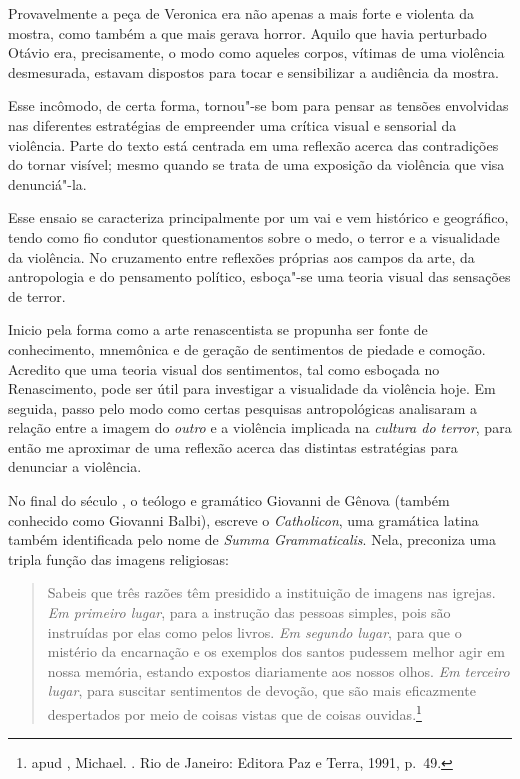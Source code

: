 Provavelmente a peça de Veronica era não apenas a mais forte e
violenta da mostra, como também a que mais gerava horror. Aquilo que
havia perturbado Otávio era, precisamente, o modo como
aqueles corpos, vítimas de uma violência desmesurada, estavam dispostos
para tocar e sensibilizar a audiência da mostra.

Esse incômodo, de certa forma,
tornou"-se bom para pensar as tensões envolvidas nas diferentes
estratégias de empreender uma crítica visual e sensorial da violência.
Parte do texto está centrada em uma reflexão acerca das contradições do
tornar visível; mesmo quando se trata de uma exposição da violência que
visa denunciá"-la.

Esse ensaio se caracteriza principalmente por um vai e
vem histórico e geográfico, tendo como fio condutor questionamentos
sobre o medo, o terror e a visualidade da violência. No cruzamento entre
reflexões próprias aos campos da arte, da antropologia e do pensamento
político, esboça"-se uma teoria visual das sensações de terror.

Inicio pela forma como a arte renascentista se propunha
ser fonte de conhecimento, mnemônica e de geração de sentimentos de
piedade e comoção. Acredito que uma teoria visual dos sentimentos, tal
como esboçada no Renascimento, pode ser útil para investigar a
visualidade da violência hoje. Em seguida, passo pelo modo como certas
pesquisas antropológicas analisaram a relação entre a imagem do
\emph{outro} e a violência implicada na \emph{cultura do terror}, para
então me aproximar de uma reflexão acerca das distintas estratégias para
denunciar a violência.

\asterisc

No final do século , o teólogo e gramático Giovanni de Gênova
(também conhecido como Giovanni Balbi), escreve o \emph{Catholicon}, uma
gramática latina também identificada pelo nome de \emph{Summa
Grammaticalis}. Nela, preconiza uma tripla função das imagens
religiosas:

\begin{quote}
Sabeis que três razões têm presidido a instituição de imagens nas
igrejas. \emph{Em primeiro lugar}, para a instrução das pessoas simples,
pois são instruídas por elas como pelos livros. \emph{Em segundo lugar},
para que o mistério da encarnação e os exemplos dos santos pudessem
melhor agir em nossa memória, estando expostos diariamente aos nossos
olhos. \emph{Em terceiro lugar}, para suscitar sentimentos de devoção,
que são mais eficazmente despertados por meio de coisas vistas que de
coisas ouvidas.\footnote{ apud , Michael. {}. Rio de Janeiro: Editora Paz e Terra, 1991, p.~49.}
\end{quote}

